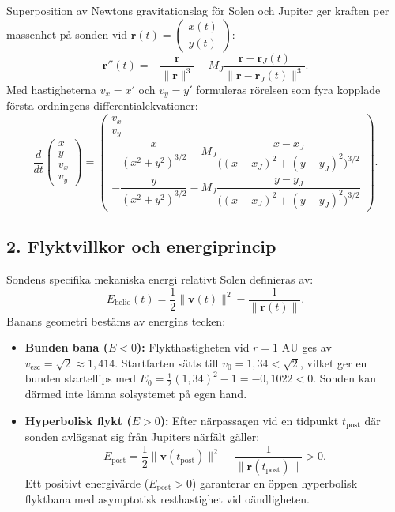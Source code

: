 \documentclass{article}
\begin{document}
Superposition av Newtons gravitationslag för Solen och Jupiter ger kraften per massenhet på sonden vid $\mathbf{r}(t) = \begin{pmatrix} x(t) \\ y(t) \end{pmatrix}$:
\begin{equation}
    \mathbf{r}''(t) = -\frac{\mathbf{r}}{\|\mathbf{r}\|^3} - M_J \frac{\mathbf{r} - \mathbf{r}_J(t)}{\|\mathbf{r} - \mathbf{r}_J(t)\|^3}.
\end{equation}
Med hastigheterna $v_x = x'$ och $v_y = y'$ formuleras rörelsen som fyra kopplade första ordningens differentialekvationer:
\begin{equation}
    \frac{d}{dt}\begin{pmatrix} x \\ y \\ v_x \\ v_y \end{pmatrix} 
    = \begin{pmatrix} v_x \\ v_y \\ -\dfrac{x}{(x^2+y^2)^{3/2}} - M_J \dfrac{x - x_J}{\big((x-x_J)^2 + (y-y_J)^2\big)^{3/2}} \\[1em] -\dfrac{y}{(x^2+y^2)^{3/2}} - M_J \dfrac{y - y_J}{\big((x-x_J)^2 + (y-y_J)^2\big)^{3/2}} \end{pmatrix}.
\end{equation}

\subsection*{2. Flyktvillkor och energiprincip}
Sondens specifika mekaniska energi relativt Solen definieras av:
\begin{equation}
    E_{\text{helio}}(t) = \frac{1}{2}\|\mathbf{v}(t)\|^2 - \frac{1}{\|\mathbf{r}(t)\|}.
\end{equation}
Banans geometri bestäms av energins tecken:
\begin{itemize}
    \item \textbf{Bunden bana ($E < 0$):} Flykthastigheten vid $r = 1\text{ AU}$ ges av $v_{\text{esc}} = \sqrt{2} \approx 1{,}414$. Startfarten sätts till $v_0 = 1{,}34 < \sqrt{2}$, vilket ger en bunden startellips med $E_0 = \frac{1}{2}(1{,}34)^2 - 1 = -0{,}1022 < 0$. Sonden kan därmed inte lämna solsystemet på egen hand.
    \item \textbf{Hyperbolisk flykt ($E > 0$):} Efter närpassagen vid en tidpunkt $t_{\text{post}}$ där sonden avlägsnat sig från Jupiters närfält gäller:
    \begin{equation}
        E_{\text{post}} = \frac{1}{2}\|\mathbf{v}(t_{\text{post}})\|^2 - \frac{1}{\|\mathbf{r}(t_{\text{post}})\|} > 0.
    \end{equation}
    Ett positivt energivärde ($E_{\text{post}} > 0$) garanterar en öppen hyperbolisk flyktbana med asymptotisk resthastighet vid oändligheten.
\end{itemize}
\end{document}
